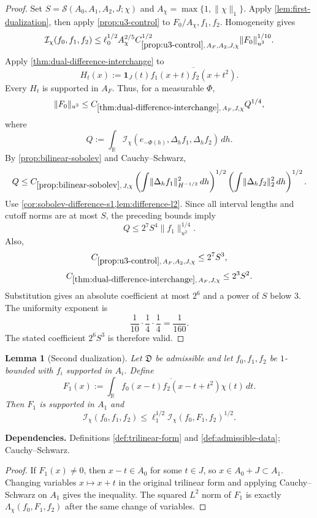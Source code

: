 \documentclass[11pt]{article}
\newtheorem{lemma}[lemma]{Lemma}
\theoremstyle{definition}
\theoremstyle{remark}
\newcommand{\R}{\mathbb R}
\newcommand{\1}{\mathbf 1}
\newcommand{\dd}{\,d}
\newcommand{\Ichi}{\mathcal I_{\chi}}
\newcommand{\Lamchi}{\Lambda_{\chi}}
\newcommand{\uNorm}[2]{\lVert #1\rVert_{u^{#2}}}
\newcommand{\hNorm}[2]{\lVert #1\rVert_{H^{#2}}}
\newcommand{\lpNorm}[2]{\lVert #1\rVert_{#2}}
\newcommand{\uses}[1]{\par\smallskip\noindent\textbf{Dependencies.} #1\par\smallskip}
\newcommand{\Ssize}[2]{\mathcal S\!\left(#1;#2\right)}
\begin{document}
\begin{proof}
Set
$S=\Ssize{A_0,A_1,A_2,J}{\chi}$ and
$A_\chi=\max\{1,\lpNorm\chi1\}$.  Apply \cref{lem:first-dualization}, then apply \cref{prop:u3-control} to
$F_0/A_\chi,f_1,f_2$.  Homogeneity gives
\[
\Ichi(f_0,f_1,f_2)
\leq
\ell_0^{1/2}A_\chi^{2/5}
C_{\ref{prop:u3-control},\,A_F,A_2,J,\chi}^{1/2}
\uNorm{F_0}3^{1/10}.
\]
Apply \cref{thm:dual-difference-interchange} to
\[
H_t(x):=\1_J(t)\overline{f_1(x+t)f_2(x+t^2)}.
\]
Every $H_t$ is supported in $A_F$.  Thus, for a measurable $\Phi$,
\[
\uNorm{F_0}3
\leq
C_{\ref{thm:dual-difference-interchange},\,A_F,J,\chi}
Q^{1/4},
\]
where
\[
Q:=\int_\R\Ichi(e_{-\Phi(h)},\Delta_hf_1,\Delta_hf_2)\dd h.
\]
By \cref{prop:bilinear-sobolev} and Cauchy--Schwarz,
\[
Q
\leq
C_{\ref{prop:bilinear-sobolev},\,J,\chi}
\left(\int\hNorm{\Delta_hf_1}{-1/2}^2\dd h\right)^{1/2}
\left(\int\lpNorm{\Delta_hf_2}2^2\dd h\right)^{1/2}.
\]
Use \cref{cor:sobolev-difference-s1,lem:difference-l2}.  Since all interval lengths and cutoff norms are at most $S$, the preceding bounds imply
\[
Q\leq2^7S^4\uNorm{f_1}2^{1/4}.
\]
Also,
\[
C_{\ref{prop:u3-control},\,A_F,A_2,J,\chi}\leq2^7S^3,
\]
\[
C_{\ref{thm:dual-difference-interchange},\,A_F,J,\chi}\leq2^3S^2.
\]
Substitution gives an absolute coefficient at most $2^6$ and a power of $S$ below $3$.  The uniformity exponent is
\[
\frac1{10}\cdot\frac14\cdot\frac14=\frac1{160}.
\]
The stated coefficient $2^6S^3$ is therefore valid.
\end{proof}

\begin{lemma}[Second dualization]\label{lem:second-dualization}
Let $\mathfrak D$ be admissible and let $f_0,f_1,f_2$ be $1$-bounded with $f_i$ supported in $A_i$.  Define
\[
F_1(x):=\int_\R\overline{f_0(x-t)f_2(x-t+t^2)}\chi(t)\dd t.
\]
Then $F_1$ is supported in $A_1$ and
\[
\Ichi(f_0,f_1,f_2)
\leq
\ell_1^{1/2}\Ichi(f_0,F_1,f_2)^{1/2}.
\]
\end{lemma}

\uses{Definitions \ref{def:trilinear-form} and \ref{def:admissible-data}; Cauchy--Schwarz.}

\begin{proof}
If $F_1(x)\neq0$, then $x-t\in A_0$ for some $t\in J$, so
$x\in A_0+J\subset A_1$.  Changing variables $x\mapsto x+t$ in the original trilinear form and applying Cauchy--Schwarz on $A_1$ gives the inequality.  The squared $L^2$ norm of $F_1$ is exactly $\Lamchi(f_0,F_1,f_2)$ after the same change of variables.
\end{proof}
\end{document}
